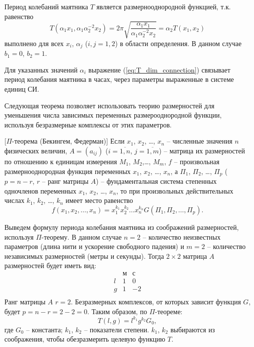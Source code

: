 \documentclass[a4paper, 14pt]{extarticle}
\begin{document}
Период колебаний маятника $T$ является размернооднородной функцией, т.к. равенство
\begin{equation}
\label{eq:T_dim_connection}
T(\alpha_1 x_1, \alpha_1 \alpha_2^{-2} x_2) = 2 \pi \sqrt{\frac{\alpha_1 x_1}{\alpha_1 \alpha_2^{-2} x_2}} = \alpha_2 T(x_1, x_2)
\end{equation}
выполнено для всех $x_i$, $\alpha_j$ ($i,j=1,2$) в области определения. В данном случае $b_1 = 0$, $b_2 = 1$. 

Для указанных значений $\alpha_i$ выражение (\ref{eq:T_dim_connection}) связывает период колебания маятника в часах, через параметры выраженные в системе единиц СИ.


Следующая теорема позволяет использовать теорию размерностей для уменьшения числа зависимых переменных размерооднородной функции, используя безразмерные комплексы от этих параметров.


\begin{theorems}{[$\Pi$-теорема (Бекингем, Федерман)]}
Если $x_1$, $x_2$, \ldots, $x_n$ -- численные значения $n$ физических величин, $A=(a_{ij})$ ($i=\overline{1,n}$, $j=\overline{1,m}$) -- матрица их размерностей по отношению к единицам измерения $M_1$, $M_2$,\ldots, $M_m$, $f$ -- произвольная размернооднородная функция переменных  $x_1$, $x_2$, \ldots, $x_n$, а $\Pi_1$, $\Pi_2$, \ldots, $\Pi_p$ ($p=n-r$, $r$ -- ранг матрицы $A$) -- фундаментальная система степенных одночленов переменных $x_1$, $x_2$, \ldots, $x_n$, то при произвольных действительных числах $k_1$, $k_2$, \ldots, $k_n$ имеет место равенство
\[
f(x_1, x_2, \ldots, x_n) = x_1^{k_1} x_2^{k_2} \ldots x_n^{k_n}
G(\Pi_1, \Pi_2, \ldots, \Pi_p).
\]
\end{theorems}

Выведем формулу периода колебания маятника из соображений размерностей, используя $\Pi$-теорему. В данном случае $n=2$ -- количество неизвестных параметров (длина нити и ускорение свободного падения) и $m=2$ -- количество независимых размерностей (метры и секунды). Тогда $2 \times 2$ матрица $A$ размерностей будет иметь вид:
\[
\begin{array}{c|c|c}
& \text{м} &  \text{с} \\
\hline
l & 1 & 0 \\
\hline
g & 1 & -2 \\
\end{array}
\]
Ранг матрицы $A$  $r=2$. Безразмерных комплексов, от которых зависит функция $G$, будет $p=n-r=2-2=0$. Таким образом, по $\Pi$-теореме:
\[
T(l,g) =  l^{k_1} g^{k_2} G_0,
\]
где $G_0$ -- константа; $k_1$, $k_2$ -- показатели степени.
$k_1$, $k_2$ выбираются из соображения, чтобы обезразмерить целевую функцию $T$. 
\end{document}
